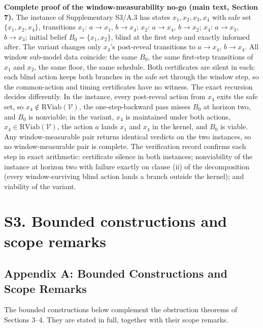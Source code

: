 \documentclass[11pt]{article}
\theoremstyle{definition}
\begin{document}
\bigskip
\noindent\textbf{Complete proof of the window-measurability no-go (main text, Section 7).}
The instance of Supplementary S3/A.3 has states \(x_{1}, x_{2}, x_{3}, x_{4}\) with safe
set \(\{x_{1}, x_{2}, x_{4}\}\), transitions \(x_{1}\): \(a \to x_{1}\), \(b \to x_{4}\);
\(x_{2}\): \(a \to x_{4}\), \(b \to x_{2}\); \(x_{4}\): \(a \to x_{3}\), \(b \to x_{3}\);
initial belief \(B_{0} = \{x_{1}, x_{2}\}\), blind at the first step and exactly informed
after. The variant changes only \(x_{4}\)'s post-reveal transitions to
\(a \to x_{4}\), \(b \to x_{4}\). All window sub-model data coincide: the same \(B_{0}\),
the same first-step transitions of \(x_{1}\) and \(x_{2}\), the same floor, the same
schedule. Both certificates are silent in each: each blind action keeps both branches in
the safe set through the window step, so the common-action and timing certificates have no
witness. The exact recursion decides differently. In the instance, every post-reveal action
from \(x_{4}\) exits the safe set, so \(x_{4} \notin \mathrm{RViab}(\mathcal{V})\), the
one-step-backward pass misses \(B_{0}\) at horizon two, and \(B_{0}\) is nonviable; in the
variant, \(x_{4}\) is maintained under both actions, \(x_{4} \in
\mathrm{RViab}(\mathcal{V})\), the action \(a\) lands \(x_{1}\) and \(x_{4}\) in the
kernel, and \(B_{0}\) is viable. Any window-measurable pair returns identical verdicts on
the two instances, so no window-measurable pair is complete. The verification record
confirms each step in exact arithmetic: certificate silence in both instances; nonviability
of the instance at horizon two with failure exactly on clause (ii) of the decomposition
(every window-surviving blind action lands a branch outside the kernel); and viability of
the variant.

\section*{S3. Bounded constructions and scope remarks}

\subsection{Appendix A: Bounded Constructions and Scope
Remarks}\label{appendix-a-bounded-constructions-and-scope-remarks}

The bounded constructions below complement the obstruction theorems of Sections 3--4. They are stated in full, together with their scope remarks.
\end{document}
